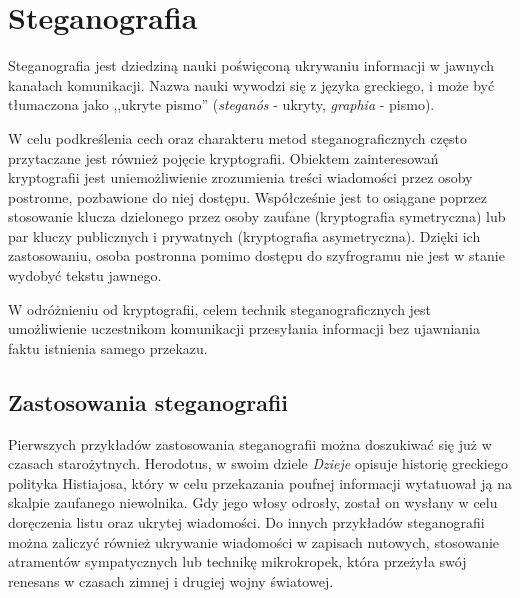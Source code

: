 
\chapter{Steganografia}\label{chap:steganography}
{

    Steganografia jest dziedziną nauki poświęconą ukrywaniu informacji w jawnych kanałach komunikacji. Nazwa nauki
    wywodzi się z języka greckiego, i może być tłumaczona jako ,,ukryte pismo'' (\textit{steganós} - ukryty,
    \textit{graphia} - pismo).

    W celu podkreślenia cech oraz charakteru metod steganograficznych często przytaczane jest również pojęcie
    kryptografii. Obiektem zainteresowań kryptografii jest uniemożliwienie zrozumienia treści wiadomości przez osoby
    postronne, pozbawione do niej dostępu. Współcześnie jest to osiągane poprzez stosowanie klucza dzielonego przez
    osoby zaufane (kryptografia symetryczna) lub par kluczy publicznych i prywatnych (kryptografia asymetryczna). Dzięki
    ich zastosowaniu, osoba postronna pomimo dostępu do szyfrogramu nie jest w stanie wydobyć tekstu jawnego.

    W odróżnieniu od kryptografii, celem technik steganograficznych jest umożliwienie uczestnikom komunikacji
    przesyłania informacji bez ujawniania faktu istnienia samego przekazu.
    
    \section{Zastosowania steganografii}
    {
        Pierwszych przykładów zastosowania steganografii można doszukiwać się już w czasach
        starożytnych\cite{Petitcolas1999InformationHS}. Herodotus, w swoim dziele \textit{Dzieje} opisuje historię
        greckiego polityka Histiajosa, który w celu przekazania poufnej informacji wytatuował ją na skalpie zaufanego
        niewolnika. Gdy jego włosy odrosły, został on wysłany w celu doręczenia listu oraz ukrytej wiadomości. Do innych
        przykładów steganografii można zaliczyć również ukrywanie wiadomości w zapisach nutowych, stosowanie atramentów
        sympatycznych lub technikę mikrokropek\cite{Petitcolas1999InformationHS}, która przeżyła swój renesans w czasach
        zimnej i drugiej wojny światowej.

}}
